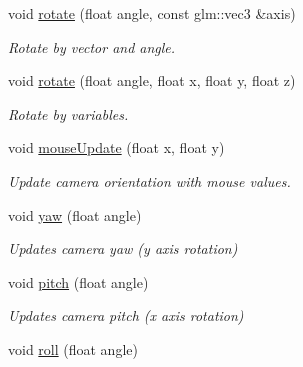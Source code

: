 \begin{DoxyCompactItemize}
\mbox{\label{class_camera_a0e6180b5a8da63a999db3de1802c8f4c}} 
void \mbox{\hyperlink{class_camera_a0e6180b5a8da63a999db3de1802c8f4c}{rotate}} (float angle, const glm\+::vec3 \&axis)
\begin{DoxyCompactList}\small\item\em Rotate by vector and angle. \end{DoxyCompactList}\item 
\mbox{\label{class_camera_a4a45040f06f24a53af7f17bbcc610f22}} 
void \mbox{\hyperlink{class_camera_a4a45040f06f24a53af7f17bbcc610f22}{rotate}} (float angle, float x, float y, float z)
\begin{DoxyCompactList}\small\item\em Rotate by variables. \end{DoxyCompactList}\item 
\mbox{\label{class_camera_a6d9db1d2cb3323a40be2d6ac1eea1763}} 
void \mbox{\hyperlink{class_camera_a6d9db1d2cb3323a40be2d6ac1eea1763}{mouse\+Update}} (float x, float y)
\begin{DoxyCompactList}\small\item\em Update camera orientation with mouse values. \end{DoxyCompactList}\item 
\mbox{\label{class_camera_ab4eab94754431725c572d528a07a35cc}} 
void \mbox{\hyperlink{class_camera_ab4eab94754431725c572d528a07a35cc}{yaw}} (float angle)
\begin{DoxyCompactList}\small\item\em Updates camera yaw (y axis rotation) \end{DoxyCompactList}\item 
\mbox{\label{class_camera_a49e00b90b94853e4485a6bdf063796de}} 
void \mbox{\hyperlink{class_camera_a49e00b90b94853e4485a6bdf063796de}{pitch}} (float angle)
\begin{DoxyCompactList}\small\item\em Updates camera pitch (x axis rotation) \end{DoxyCompactList}\item 
\mbox{\label{class_camera_a72be99f88b1cc21122178109d3441818}} 
void \mbox{\hyperlink{class_camera_a72be99f88b1cc21122178109d3441818}{roll}} (float angle)

\end{DoxyCompactItemize}
